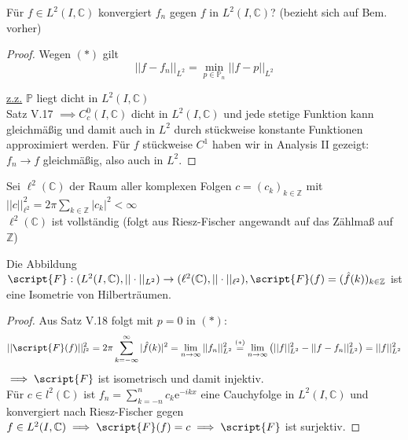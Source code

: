   \begin{theorem}
    Für $f \in L^2(I, \mathbb{C})$ konvergiert $f_n$ gegen $f$ in $L^2(I, \mathbb{C})$? (bezieht sich auf Bem. vorher)
  \end{theorem}
  \begin{proof}
    Wegen $(\ast)$ gilt $$ ||f-f_n||_{L^2} = \min\limits_{p\in\mathbb{P}_n} ||f-p||_{L^2}$$
    \item[]\underline{z.z.} $\mathbb{P}$ liegt dicht in $L^2(I,\mathbb{C})$ \\
    Satz V.17 $\implies C_c^0(I,\mathbb{C})$ dicht in $L^2(I,\mathbb{C})$ und jede stetige Funktion kann gleichmäßig und damit auch in $L^2$ durch stückweise konstante Funktionen approximiert werden. Für $f$ stückweise $C^1$ haben wir in Analysis II gezeigt: $f_n \to f$ gleichmäßig, also auch in $L^2$. 
  \end{proof}

  \begin{remark}
    Sei $\ell^2(\mathbb{C})$ der Raum aller komplexen Folgen $c = (c_k)_{k \in \mathbb{Z}}$ mit $||c||_{\ell^2}^2 = 2 \pi \sum\limits_{k \in \mathbb{Z}} |c_k|^2 < \infty$\\
    $\ell^2(\mathbb{C})$ ist vollständig (folgt aus Riesz-Fischer angewandt auf das Zählmaß auf $\mathbb{Z}$)
  \end{remark}

  \begin{lemma}
    Die Abbildung $\script{F}: (L^2(I, \mathbb{C}), ||\cdot||_{L^2}) \to (\ell^2(\mathbb{C}), ||\cdot||_{\ell^2}), \script{F}(f) = (\hat{f}(k))_{k \in \mathbb{Z}}$ ist eine Isometrie von Hilberträumen.
  \end{lemma}

  \begin{proof}
    Aus Satz V.18 folgt mit $p=0$ in $(\ast)$: $$  ||\script{F}(f)||_{l^2}^2 = 2\pi \sum\limits_{k=-\infty}^\infty |\hat{f}(k)|^2 = \lim\limits_{n\to\infty} ||f_n||_{L^2}^2 \overset{(\ast)}{=} \lim\limits_{n\to\infty} \left( ||f||_{L^2}^2 - ||f-f_n||^2_{L^2}\right) = ||f||_{L^2}^2$$ 
    $\implies \script{F}$ ist isometrisch und damit injektiv. \\
    Für $c\in l^2(\mathbb{C})$ ist $f_n = \sum\limits_{k=-n}^n c_k \text{e}^{-ikx}$ eine Cauchyfolge in $L^2(I,\mathbb{C})$ und konvergiert nach Riesz-Fischer gegen $f\in L^2(I,\mathbb{C}) \implies \script{F}(f) = c \implies \script{F}$ ist surjektiv. 
  \end{proof}

